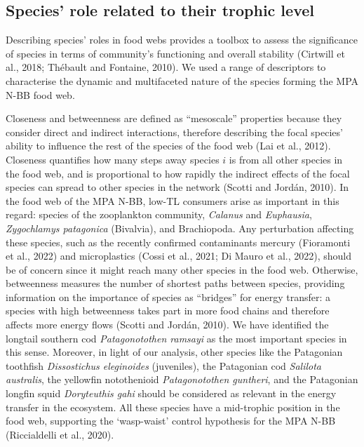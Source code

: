 \documentclass[preprint, 3p,
authoryear]{elsarticle} %
\begin{document}
\hypertarget{species-role-related-to-their-trophic-level}{%
\subsection{Species' role related to their trophic
level}\label{species-role-related-to-their-trophic-level}}

Describing species' roles in food webs provides a toolbox to assess the
significance of species in terms of community's functioning and overall
stability (Cirtwill et al., 2018; Thébault and Fontaine, 2010). We used
a range of descriptors to characterise the dynamic and multifaceted
nature of the species forming the MPA N-BB food web.

Closeness and betweenness are defined as ``mesoscale'' properties
because they consider direct and indirect interactions, therefore
describing the focal species' ability to influence the rest of the
species of the food web (Lai et al., 2012). Closeness quantifies how
many steps away species \(i\) is from all other species in the food web,
and is proportional to how rapidly the indirect effects of the focal
species can spread to other species in the network (Scotti and Jordán,
2010). In the food web of the MPA N-BB, low-TL consumers arise as
important in this regard: species of the zooplankton community,
\emph{Calanus} and \emph{Euphausia}, \emph{Zygochlamys patagonica}
(Bivalvia), and Brachiopoda. Any perturbation affecting these species,
such as the recently confirmed contaminants mercury (Fioramonti et al.,
2022) and microplastics (Cossi et al., 2021; Di Mauro et al., 2022),
should be of concern since it might reach many other species in the food
web. Otherwise, betweenness measures the number of shortest paths
between species, providing information on the importance of species as
``bridges'' for energy transfer: a species with high betweenness takes
part in more food chains and therefore affects more energy flows (Scotti
and Jordán, 2010). We have identified the longtail southern cod
\emph{Patagonotothen ramsayi} as the most important species in this
sense. Moreover, in light of our analysis, other species like the
Patagonian toothfish \emph{Dissostichus eleginoides} (juveniles), the
Patagonian cod \emph{Salilota australis}, the yellowfin notothenioid
\emph{Patagonotothen guntheri}, and the Patagonian longfin squid
\emph{Doryteuthis gahi} should be considered as relevant in the energy
transfer in the ecosystem. All these species have a mid-trophic position
in the food web, supporting the `wasp-waist' control hypothesis for the
MPA N-BB (Riccialdelli et al., 2020).
\end{document}
